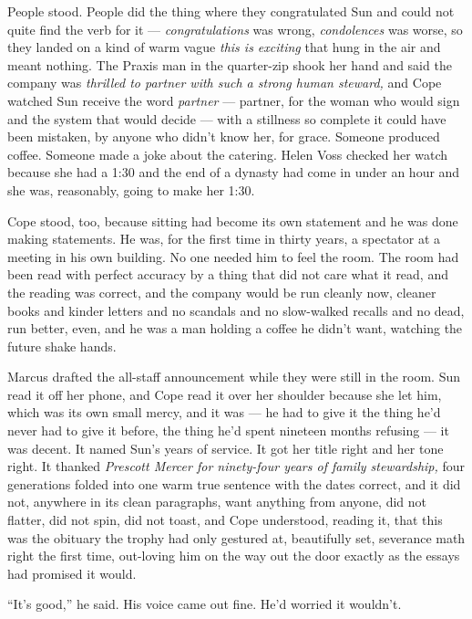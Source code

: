 \documentclass[11pt,openany]{book}
\begin{document}
People stood. People did the thing where they congratulated Sun and could not quite find the verb for it --- \textit{congratulations} was wrong, \textit{condolences} was worse, so they landed on a kind of warm vague \textit{this is exciting} that hung in the air and meant nothing. The Praxis man in the quarter-zip shook her hand and said the company was \textit{thrilled to partner with such a strong human steward,} and Cope watched Sun receive the word \textit{partner} --- partner, for the woman who would sign and the system that would decide --- with a stillness so complete it could have been mistaken, by anyone who didn't know her, for grace. Someone produced coffee. Someone made a joke about the catering. Helen Voss checked her watch because she had a 1:30 and the end of a dynasty had come in under an hour and she was, reasonably, going to make her 1:30.

Cope stood, too, because sitting had become its own statement and he was done making statements. He was, for the first time in thirty years, a spectator at a meeting in his own building. No one needed him to feel the room. The room had been read with perfect accuracy by a thing that did not care what it read, and the reading was correct, and the company would be run cleanly now, cleaner books and kinder letters and no scandals and no slow-walked recalls and no dead, run better, even, and he was a man holding a coffee he didn't want, watching the future shake hands.

Marcus drafted the all-staff announcement while they were still in the room. Sun read it off her phone, and Cope read it over her shoulder because she let him, which was its own small mercy, and it was --- he had to give it the thing he'd never had to give it before, the thing he'd spent nineteen months refusing --- it was decent. It named Sun's years of service. It got her title right and her tone right. It thanked \textit{Prescott Mercer for ninety-four years of family stewardship,} four generations folded into one warm true sentence with the dates correct, and it did not, anywhere in its clean paragraphs, want anything from anyone, did not flatter, did not spin, did not toast, and Cope understood, reading it, that this was the obituary the trophy had only gestured at, beautifully set, severance math right the first time, out-loving him on the way out the door exactly as the essays had promised it would.

``It's good,'' he said. His voice came out fine. He'd worried it wouldn't.
\end{document}
